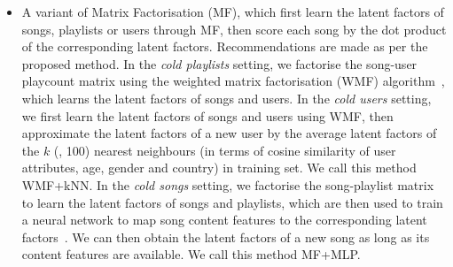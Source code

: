 \begin{itemize}
\item A variant of Matrix Factorisation (MF), which first learn the latent factors of songs, playlists
      or users through MF, then score each song by the dot product of the corresponding latent factors.
      Recommendations are made as per the proposed method.
      In the \emph{cold playlists} setting, we factorise the song-user playcount matrix using the 
      weighted matrix factorisation (WMF) algorithm~\cite{hu2008collaborative}, which learns the 
      latent factors of songs and users.
      In the \emph{cold users} setting, we first learn the latent factors of songs and users using WMF,
      then approximate the latent factors of a new user by the average latent factors of the $k$ (\eg, 100)
      nearest neighbours %
      (in terms of cosine similarity of user attributes, \eg age, gender and country) in training set.
      We call this method WMF+kNN.
      In the \emph{cold songs} setting, we factorise the song-playlist matrix to learn the latent factors of 
      songs and playlists, which are then used to train a neural network to map song content features 
      to the corresponding latent factors~\cite{Gantner:2010,van2013deep}.
	  We can then obtain the latent factors of a new song as long as its content features are available.
      We call this method MF+MLP. 
%
\end{itemize}


